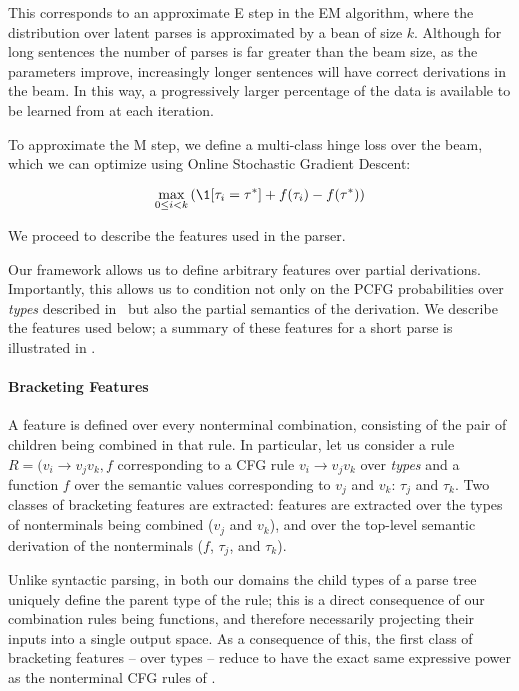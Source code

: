 This corresponds to an approximate E step in the EM algorithm, where the
  distribution over latent parses is approximated by a bean of size $k$.
Although for long sentences the number of parses is far greater than the
  beam size, as the parameters improve, increasingly longer sentences will
  have correct derivations in the beam.
In this way, a progressively larger percentage of the data is available to be
	learned from at each iteration.

To approximate the M step, 
  we define a multi-class hinge loss over the beam, which we can optimize
  using Online Stochastic Gradient Descent:

\begin{equation}
\max_{0 \leq i < k} \left(
  \1[\tau_i = \tau^*] + f(\tau_i) - f(\tau^*)
\right)
\end{equation}

We proceed to describe the features used in the parser.

Our framework allows us to define arbitrary features over partial derivations.
Importantly, this allows us to condition not only on the PCFG probabilities
  over \textit{types} described in \me\ but also the partial semantics of the
  derivation.
We describe the features used below; a summary of these features
  for a short parse is illustrated in \needfig.

\paragraph{Bracketing Features}
A feature is defined over every nonterminal combination,
  consisting of the pair of children being combined in that rule.
In particular, let us consider a rule
  $R = (v_i \rightarrow v_j v_k, f$ corresponding to a CFG rule
  $v_i \rightarrow v_j v_k$ over \textit{types} and a function $f$ over the
  semantic values corresponding to $v_j$ and $v_k$: $\tau_j$ and $\tau_k$.
Two classes of bracketing features are extracted:
  features are extracted over the types of nonterminals being combined
    ($v_j$ and $v_k$),
  and over the top-level semantic derivation of the nonterminals
    ($f$, $\tau_j$, and $\tau_k$).

Unlike syntactic parsing, in both our domains the child types of a parse tree
  uniquely define the parent type of the rule; this is a direct consequence
  of our combination rules being functions, and therefore necessarily projecting
  their inputs into a single output space.
As a consequence of this, the first class of bracketing features -- over
  types -- reduce to have the exact same
  expressive power as the nonterminal CFG rules of \me.

